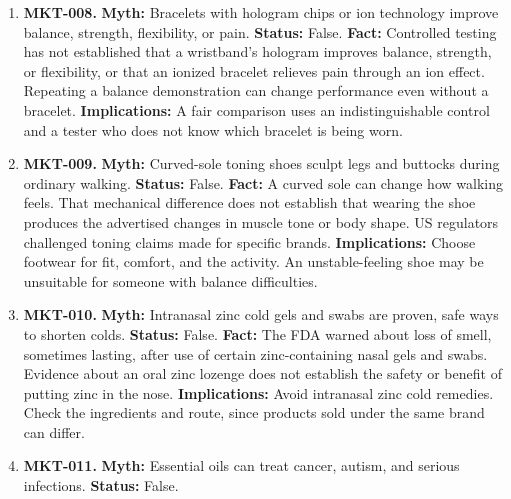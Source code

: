 \documentclass[11pt,oneside]{book}
\begin{document}
\begin{enumerate}[leftmargin=0pt,labelwidth=0pt,labelsep=0pt,itemindent=0pt]
\textbf{Implications:} Check the serving regimen and comparator before applying a study result. Persistent changes in bowel habits deserve assessment.
\item[] \textbf{MKT-008.} \textbf{Myth:} Bracelets with hologram chips or ion technology improve balance, strength, flexibility, or pain.\newline
\textbf{Status:} False.\newline
\textbf{Fact:} Controlled testing has not established that a wristband's hologram improves balance, strength, or flexibility, or that an ionized bracelet relieves pain through an ion effect. Repeating a balance demonstration can change performance even without a bracelet. \cite{ref92,ref93}\newline
\textbf{Implications:} A fair comparison uses an indistinguishable control and a tester who does not know which bracelet is being worn.
\item[] \textbf{MKT-009.} \textbf{Myth:} Curved-sole toning shoes sculpt legs and buttocks during ordinary walking.\newline
\textbf{Status:} False.\newline
\textbf{Fact:} A curved sole can change how walking feels. That mechanical difference does not establish that wearing the shoe produces the advertised changes in muscle tone or body shape. US regulators challenged toning claims made for specific brands. \cite{ref94,ref95}\newline
\textbf{Implications:} Choose footwear for fit, comfort, and the activity. An unstable-feeling shoe may be unsuitable for someone with balance difficulties.
\item[] \textbf{MKT-010.} \textbf{Myth:} Intranasal zinc cold gels and swabs are proven, safe ways to shorten colds.\newline
\textbf{Status:} False.\newline
\textbf{Fact:} The FDA warned about loss of smell, sometimes lasting, after use of certain zinc-containing nasal gels and swabs. Evidence about an oral zinc lozenge does not establish the safety or benefit of putting zinc in the nose. \cite{ref96,ref195}\newline
\textbf{Implications:} Avoid intranasal zinc cold remedies. Check the ingredients and route, since products sold under the same brand can differ.
\item[] \textbf{MKT-011.} \textbf{Myth:} Essential oils can treat cancer, autism, and serious infections.\newline
\textbf{Status:} False.\newline

\end{enumerate}
\end{document}
